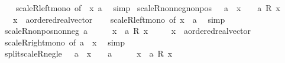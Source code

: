 \begin{isabellebody}
%
\isadelimproof
\ \ %
\endisadelimproof
%
\isatagproof
{}\isamarkupfalse%
\ scaleR{\isacharunderscore}{\kern0pt}left{\isacharunderscore}{\kern0pt}mono\ {\isacharbrackleft}{\kern0pt}of\ {}\ x\ a{\isacharbrackright}{\kern0pt}\ \isamarkupfalse%
\ simp%
\endisatagproof
{\isafoldproof}%
%
\isadelimproof
\isanewline
%
\endisadelimproof
\isanewline
{}\isamarkupfalse%
\ scaleR{\isacharunderscore}{\kern0pt}nonneg{\isacharunderscore}{\kern0pt}nonpos{\isacharcolon}{\kern0pt}\ {\isachardoublequoteopen}{}\ {\isasymle}\ a\ {\isasymLongrightarrow}\ x\ {\isasymle}\ {}\ {\isasymLongrightarrow}\ a\ {\isacharasterisk}{\kern0pt}\isactrlsub R\ x\ {\isasymle}\ {}{\isachardoublequoteclose}\isanewline
\ \ \ x\ {\isacharcolon}{\kern0pt}{\isacharcolon}{\kern0pt}\ {\isachardoublequoteopen}{\isacharprime}{\kern0pt}a{\isacharcolon}{\kern0pt}{\isacharcolon}{\kern0pt}ordered{\isacharunderscore}{\kern0pt}real{\isacharunderscore}{\kern0pt}vector{\isachardoublequoteclose}\isanewline
%
\isadelimproof
\ \ %
\endisadelimproof
%
\isatagproof
{}\isamarkupfalse%
\ scaleR{\isacharunderscore}{\kern0pt}left{\isacharunderscore}{\kern0pt}mono\ {\isacharbrackleft}{\kern0pt}of\ x\ {}\ a{\isacharbrackright}{\kern0pt}\ \isamarkupfalse%
\ simp%
\endisatagproof
{\isafoldproof}%
%
\isadelimproof
\isanewline
%
\endisadelimproof
\isanewline
{}\isamarkupfalse%
\ scaleR{\isacharunderscore}{\kern0pt}nonpos{\isacharunderscore}{\kern0pt}nonneg{\isacharcolon}{\kern0pt}\ {\isachardoublequoteopen}a\ {\isasymle}\ {}\ {\isasymLongrightarrow}\ {}\ {\isasymle}\ x\ {\isasymLongrightarrow}\ a\ {\isacharasterisk}{\kern0pt}\isactrlsub R\ x\ {\isasymle}\ {}{\isachardoublequoteclose}\isanewline
\ \ \ x\ {\isacharcolon}{\kern0pt}{\isacharcolon}{\kern0pt}\ {\isachardoublequoteopen}{\isacharprime}{\kern0pt}a{\isacharcolon}{\kern0pt}{\isacharcolon}{\kern0pt}ordered{\isacharunderscore}{\kern0pt}real{\isacharunderscore}{\kern0pt}vector{\isachardoublequoteclose}\isanewline
%
\isadelimproof
\ \ %
\endisadelimproof
%
\isatagproof
{}\isamarkupfalse%
\ scaleR{\isacharunderscore}{\kern0pt}right{\isacharunderscore}{\kern0pt}mono\ {\isacharbrackleft}{\kern0pt}of\ a\ {}\ x{\isacharbrackright}{\kern0pt}\ \isamarkupfalse%
\ simp%
\endisatagproof
{\isafoldproof}%
%
\isadelimproof
\isanewline
%
\endisadelimproof
\isanewline
{}\isamarkupfalse%
\ split{\isacharunderscore}{\kern0pt}scaleR{\isacharunderscore}{\kern0pt}neg{\isacharunderscore}{\kern0pt}le{\isacharcolon}{\kern0pt}\ {\isachardoublequoteopen}{\isacharparenleft}{\kern0pt}{}\ {\isasymle}\ a\ {\isasymand}\ x\ {\isasymle}\ {}{\isacharparenright}{\kern0pt}\ {\isasymor}\ {\isacharparenleft}{\kern0pt}a\ {\isasymle}\ {}\ {\isasymand}\ {}\ {\isasymle}\ x{\isacharparenright}{\kern0pt}\ {\isasymLongrightarrow}\ a\ {\isacharasterisk}{\kern0pt}\isactrlsub R\ x\ {\isasymle}\ {}{\isachardoublequoteclose}\isanewline

\end{isabellebody}
